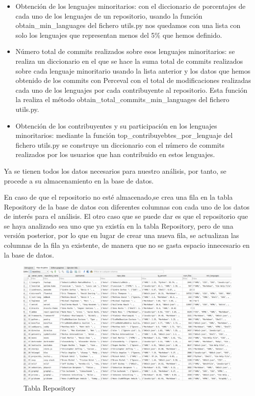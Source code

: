 \documentclass[a4paper, 12pt]{book}
\begin{document}
\begin{itemize}
  \item Obtención de los lenguajes minoritarios: con el diccionario de porcentajes de cada uno de los lenguajes de un repositorio, usando la función obtain\_min\_languages del fichero utils.py nos quedamos con una lista con solo los lenguajes que representan menos del 5\% que hemos definido.
  \item Número total de commits realizados sobre esos lenguajes minoritarios: se realiza un diccionario en el que se hace la suma total de commits realizados sobre cada lenguaje minoritario usando la lista anterior y los datos que hemos obtenido de los commits con Perceval con el total de modificaciones realizadas cada uno de los lenguajes por cada contribuyente al repositorio. Esta función la realiza el método obtain\_total\_commits\_min\_languages del fichero utils.py.
  \item Obtención de los contribuyentes y su participación en los lenguajes minoritarios: mediante la función top\_contribuyebtes\_por\_lenguaje del fichero utils.py se construye un diccionario con el número de commits realizados por los usuarios que han contribuido en estos lenguajes.
\end{itemize}

Ya se tienen todos los datos necesarios para nuestro análisis, por tanto, se procede a su almacenamiento en la base de datos.

En caso de que el repositorio no esté almacenado,se crea una fila en la tabla Repository de la base de datos con diferentes columnas con cada uno de los datos de interés para el análisis. El otro caso que se puede dar es que el repositorio que se haya analizado sea uno que ya existía en la tabla Repository, pero de una versión posterior, por lo que en lugar de crear una nueva fila, se actualizan las columnas de la fila ya existente, de manera que no se gasta espacio innecesario en la base de datos.

\begin{figure}[H]
  \centering
  \includegraphics[width=1\textwidth]{img/tablarepository.png}
  \caption{Tabla Repository}
  \label{figura:tablarepo}
\end{figure}
\end{document}

